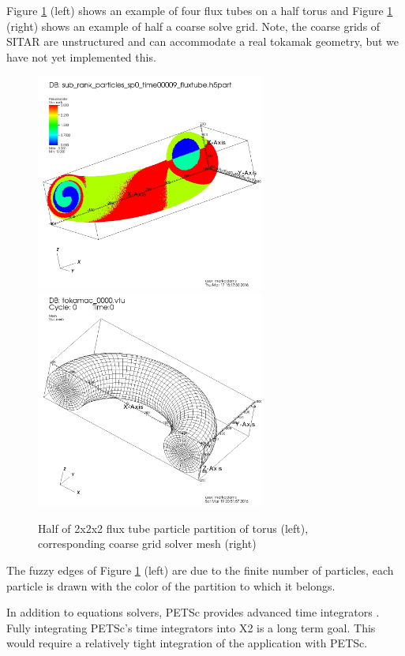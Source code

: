 \documentclass[review]{siamart}
\begin{document}
Figure \ref{fig:cross} (left) shows an example of four flux tubes on a half torus and Figure \ref{fig:cross} (right) shows an example of half a coarse solve grid.
Note, the coarse grids of SITAR are unstructured and can accommodate a real tokamak geometry, but we have not yet implemented this.
\begin{figure}[h!]
   \centering
   \includegraphics[width=75mm]{half_grid.jpeg} 
    \includegraphics[width=75mm]{half_grid_mesh.jpeg} 
   \caption{Half of  2x2x2 flux tube particle partition of torus (left), corresponding coarse grid solver mesh (right)}
   \label{fig:cross}
\end{figure}
The fuzzy edges of Figure \ref{fig:cross} (left) are due to the finite number of particles, each particle is drawn with the color of the partition to which it belongs.

In addition to equations solvers, PETSc provides advanced time integrators \cite{KnepleyBrownMcInnesSmithRuppAdams2015b}.
Fully integrating PETSc's time integrators into X2 is a long term goal.
This would require a relatively tight integration of the application with PETSc.
\end{document}
